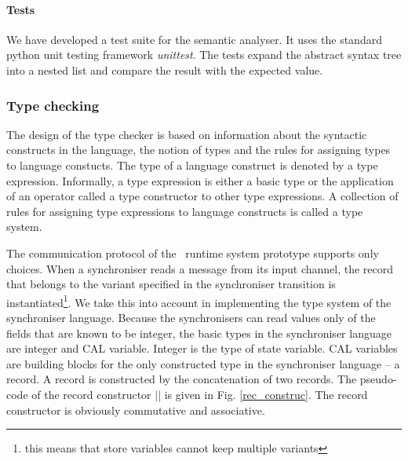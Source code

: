 

    \paragraph{Tests}
We have developed a test suite for the semantic analyser. It uses the standard python unit testing framework \emph{unittest}. The tests expand the abstract syntax tree into a nested list and compare the result with the expected value.


  \subsubsection{Type checking\label{type_check}}
The design of the type checker is based on information about the syntactic constructs in the language, the notion of types and the rules for assigning types to language constucts. The type of a language construct is denoted by a type expression. Informally, a type expression is either a basic type or the application of an operator called a type constructor to other type expressions. A collection of rules for assigning type expressions to language constructs is called a type system.

The communication protocol of the \ak\ runtime system prototype supports only choices. When a synchroniser reads a message from its input channel, the record that belongs to the variant specified in the synchroniser transition is instantiated\footnote{this means that store variables cannot keep multiple variants}. We take this into account in implementing the type system of the synchroniser language. Because the synchronisers can read values only of the fields that are known to be integer, the basic types in the synchroniser language are integer and CAL variable. Integer is the type of state variable. CAL variables are building blocks for the only constructed type in the synchroniser language -- a record. A record is constructed by the concatenation of two records. The pseudo-code of the record constructor $||$ is given in Fig. \ref{rec_construc}. The record constructor is obviously commutative and associative.

